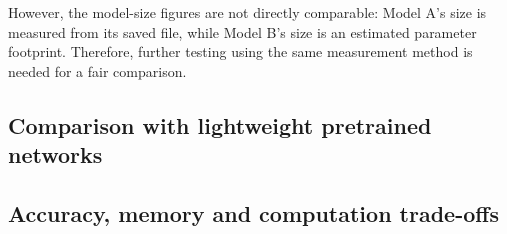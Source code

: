 \documentclass[12pt,a4paper]{article}
\begin{document}
However, the model-size figures are not directly comparable:
Model A's size is measured from its saved file, while Model B's
size is an estimated parameter footprint. Therefore, further
testing using the same measurement method is needed for a
fair comparison.

\subsection{Comparison with lightweight pretrained networks}
\begin{table}[H]\centering
\caption{Comparison of Model B with pretrained lightweight models}\label{tab:sotacomparison}
\end{table}


\subsection{Accuracy, memory and computation trade-offs}
\end{document}

